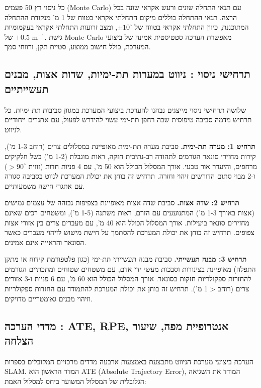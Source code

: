 כל ניסוי רץ 50 פעמים (Monte Carlo) עם תנאי התחלה שונים ורעש אקראי שונה בכל הרצה. תנאי ההתחלה כוללים מיקום התחלתי אקראי בטווח של 1 מ' מנקודת ההתחלה המתוכננת, כיוון התחלתי אקראי בטווח של $\pm 10^\circ$, ומצב זרועות התחלתי אקראי בעקמומיות של $\pm 0.5$ m$^{-1}$. גישת Monte Carlo מאפשרת הערכה סטטיסטית אמינה של ביצועי המערכת, כולל חישוב ממוצע, סטיית תקן, ורווחי סמך.

\subsection{תרחישי ניסוי : ניווט במערות תת-ימיות, שדות אצות, מבנים תעשייתיים}
\label{sec:ch08_scenarios}

שלושה תרחישי ניסוי מייצגים נבחנו להערכת ביצועי המערכת במגוון סביבות תת-ימיות. כל תרחיש מדמה סביבה טיפוסית שבה רחפן תת-ימי עשוי להידרש לפעול, עם אתגרים ייחודיים לניווט.

\textbf{תרחיש 1: מערה תת-ימית.} סביבת מערה תת-ימית מאופיינת במסלולים צרים (רוחב 1-3 מ'), קירות מחזירי סונאר הגורמים לתהודה רב-נתיבית חזקה, ראות מוגבלת (1-2 מ') בשל חלקיקים מרחפים, והיעדר אור טבעי. אורך המסלול הכולל הוא 50 מ', עם 4 פניות חדות (זווית $> 90^\circ$) ו-2 מבוי סתום הדורשים זיהוי וחזרה. תרחיש זה בוחן את יכולת המערכת לנווט בסביבה סגורה עם אתגרי חישה משמעותיים.

\textbf{תרחיש 2: שדה אצות.} סביבת שדה אצות מאופיינת בצפיפות גבוהה של עצמים גמישים (אצות באורך 1-3 מ') המתנועעים עם הזרם, ראות משתנה (1-5 מ'), ומשטחים רכים שאינם מחזירים סונאר ביעילות. אורך המסלול הכולל הוא 40 מ', עם מעברים צרים בין אזורי אצות צפופים. תרחיש זה בוחן את יכולת המערכת להסתמך על חישת מישוש לזיהוי מעברים כאשר הסונאר והראייה אינם אמינים.

\textbf{תרחיש 3: מבנה תעשייתי.} סביבת מבנה תעשייתי תת-ימי (כגון פלטפורמת קידוח או מתקן התפלה) מאופיינת בצינורות וסבכות מעשי ידי אדם, עם משטחים שטוחים ומתכתיים הגורמים להחזרות ספקולריות חזקות בסונאר. אורך המסלול הכולל הוא 60 מ', עם 6 פניות ו-3 אזורים צרים (רוחב < 1 מ'). תרחיש זה בוחן את יכולת המערכת להתמודד עם החזרות ספקולריות וזיהוי מבנים גאומטריים מדויקים.

\subsection{מדדי הערכה : ATE, RPE, אנטרופיית מפה, שיעור הצלחה}
\label{sec:ch08_metrics}

הערכת ביצועי מערכת הניווט מתבצעת באמצעות ארבעה מדדים מרכזיים המקובלים בספרות SLAM. המדד הראשון הוא ATE (Absolute Trajectory Error), המודד את השגיאה הגלובלית של המסלול המשוער ביחס למסלול האמת:

